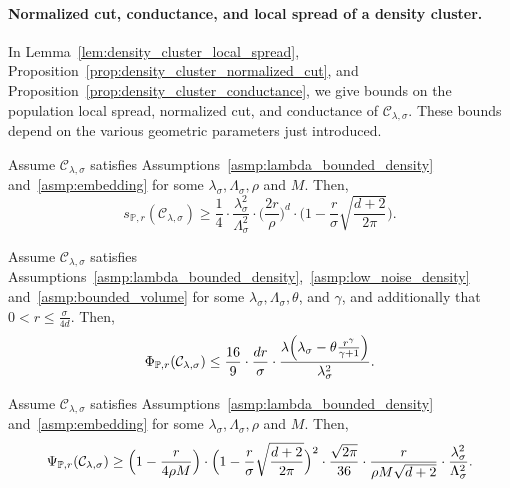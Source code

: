 \documentclass[11pt,twoside]{article}
\newcommand{\1}{\mathbf{1}}
\newcommand{\mc}[1]{\mathcal{#1}}
\newcommand{\Pbb}{\mathbb{P}}
\begin{document}
\paragraph{Normalized cut, conductance, and local spread of a density cluster.} In Lemma~\ref{lem:density_cluster_local_spread}, Proposition~\ref{prop:density_cluster_normalized_cut}, and Proposition~\ref{prop:density_cluster_conductance}, we give bounds on the population local spread, normalized cut, and conductance of $\mc{C}_{\lambda,\sigma}$. These bounds depend on the various geometric parameters just introduced. 
\begin{lemma}
	\label{lem:density_cluster_local_spread}
	Assume $\mc{C}_{\lambda,\sigma}$ satisfies Assumptions~\ref{asmp:lambda_bounded_density} and~\ref{asmp:embedding} for some $\lambda_{\sigma},\Lambda_{\sigma},\rho$ and $M$. Then,
	\begin{equation}
	\label{eqn:density_cluster_local_spread}
	s_{\Pbb,r}(\mc{C}_{\lambda,\sigma}) \geq \frac{1}{4} \cdot \frac{\lambda_{\sigma}^2}{\Lambda_{\sigma}^2} \cdot \biggl(\frac{2r}{\rho}\biggr)^{d} \cdot \biggl(1 - \frac{r}{\sigma} \sqrt{\frac{d + 2}{2\pi}}\biggr).
	\end{equation}
\end{lemma}

\begin{proposition}
	\label{prop:density_cluster_normalized_cut}
	Assume $\mc{C}_{\lambda,\sigma}$ satisfies Assumptions~\ref{asmp:lambda_bounded_density},~\ref{asmp:low_noise_density} and~\ref{asmp:bounded_volume} for some $\lambda_{\sigma}, \Lambda_{\sigma}, \theta$, and $\gamma$, and additionally that $0 < r \leq \frac{\sigma}{4d}$. Then,
	\begin{equation}
	\label{eqn:density_cluster_normalized_cut}
	\Phi_{\Pbb,r}(\mc{C}_{\lambda,\sigma}) \leq \frac{16}{9} \cdot \frac{dr}{\sigma} \cdot \frac{\lambda\Bigl(\lambda_{\sigma} - \theta \frac{r^{\gamma}}{\gamma + 1}\Bigr)}{\lambda_{\sigma}^2}.
	\end{equation}
\end{proposition}

\begin{proposition}
	\label{prop:density_cluster_conductance}
	Assume $\mc{C}_{\lambda,\sigma}$ satisfies Assumptions~\ref{asmp:lambda_bounded_density} and~\ref{asmp:embedding} for some $\lambda_{\sigma}, \Lambda_{\sigma}, \rho$ and $M$. Then,
	\begin{equation}
	\label{eqn:density_cluster_conductance}
	\Psi_{\Pbb,r}(\mc{C}_{\lambda,\sigma}) \geq \Bigl(1 - \frac{r}{4\rho M}\Bigr) \cdot \Bigl(1 - \frac{r}{\sigma}\sqrt{\frac{d + 2}{2\pi}}\Bigr)^2 \cdot \frac{\sqrt{2\pi}}{36} \cdot \frac{r}{\rho M \sqrt{d + 2}} \cdot \frac{\lambda_{\sigma}^2}{\Lambda_{\sigma}^2}.
	\end{equation}
\end{proposition}
\end{document}
